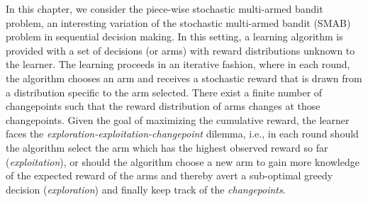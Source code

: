In this chapter, we consider the piece-wise stochastic multi-armed bandit problem, an interesting variation of the stochastic multi-armed bandit (SMAB) problem in sequential decision making. In this setting,  a learning algorithm is provided with a set of decisions (or arms) with reward distributions unknown to the learner. The learning proceeds in an iterative fashion, where in each round, the algorithm chooses an arm and receives a stochastic reward that is drawn from a distribution specific to the arm selected. There exist a finite number of changepoints such that the reward distribution of arms changes at those changepoints. Given the goal of maximizing the cumulative reward, the learner faces the \textit{exploration-exploitation-changepoint} dilemma, i.e., in each round should the algorithm select the arm which has the highest observed reward so far (\textit{exploitation}), or should the algorithm choose a new arm to gain more knowledge of the expected reward of the arms and thereby avert a sub-optimal greedy decision (\textit{exploration}) and finally keep track of the \textit{changepoints}. 

